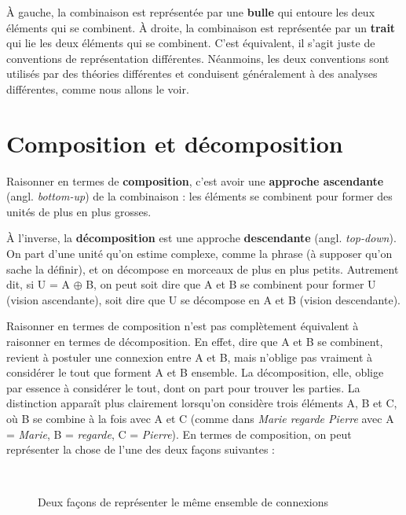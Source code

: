 À gauche, la combinaison est représentée par une \textbf{bulle} qui entoure les deux éléments qui se combinent. À droite, la combinaison est représentée par un \textbf{trait} qui lie les deux éléments qui se combinent. C’est équivalent, il s’agit juste de conventions de représentation différentes. Néanmoins, les deux conventions sont utilisés par des théories différentes et conduisent généralement à des analyses différentes, comme nous allons le voir.

\section{Composition et décomposition}\label{sec:3.2.13}

Raisonner en termes de \textbf{composition}, c’est avoir une \textbf{approche ascendante} (angl. \textit{bottom-up}) de la combinaison : les éléments se combinent pour former des unités de plus en plus grosses.

À l’inverse, la \textbf{décomposition} est une approche \textbf{descendante} (angl. \textit{top-down}). On part d’une unité qu’on estime complexe, comme la phrase (à supposer qu’on sache la définir), et on décompose en morceaux de plus en plus petits. Autrement dit, si U = A ${\oplus}$ B, on peut soit dire que A et B se combinent pour former U (vision ascendante), soit dire que U se décompose en A et B (vision descendante).

Raisonner en termes de composition n’est pas complètement équivalent à raisonner en termes de décomposition. En effet, dire que A et B se combinent, revient à postuler une connexion entre A et B, mais n’oblige pas vraiment à considérer le tout que forment A et B ensemble. La décomposition, elle, oblige par essence à considérer le tout, dont on part pour trouver les parties. La distinction apparaît plus clairement lorsqu’on considère trois éléments A, B et C, où B se combine à la fois avec A et C (comme dans \textit{Marie regarde Pierre} avec A = \textit{Marie}, B = \textit{regarde}, C = \textit{Pierre}). En termes de composition, on peut représenter la chose de l’une des deux façons suivantes :

\begin{figure}
\medskip\\

\caption{\label{fig:}Deux façons de représenter le même ensemble de connexions}
\end{figure}

